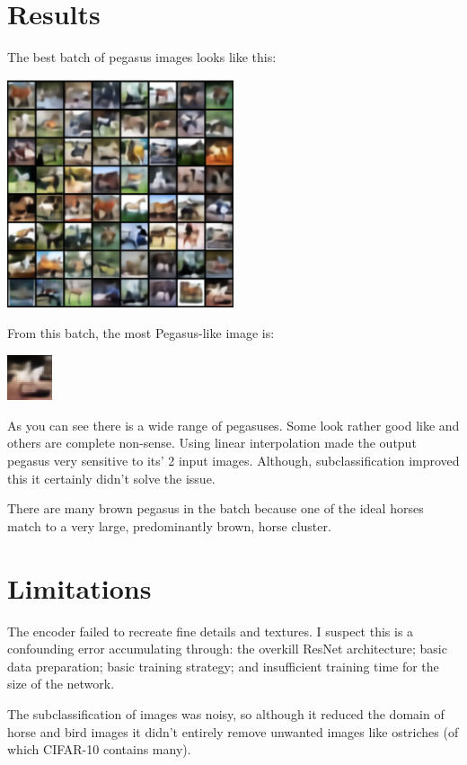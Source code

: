 \documentclass{article}
\begin{document}
\section{Results}
The best batch of pegasus images looks like this:
\begin{center}
    \includegraphics[width=0.5\textwidth]{figures/64_cropped.png}
\end{center}
From this batch, the most Pegasus-like image is:
\begin{center}
    \includegraphics[width=0.1\textwidth]{figures/1_cropped.png}
\end{center}

As you can see there is a wide range of pegasuses. Some look rather good like and others are complete non-sense. Using linear interpolation made the output pegasus very sensitive to its' 2 input images. Although, subclassification improved this it certainly didn't solve the issue.

There are many brown pegasus in the batch because one of the ideal horses match to a very large, predominantly brown, horse cluster.

\section{Limitations}
The encoder failed to recreate fine details and textures. I suspect this is a confounding error accumulating through: the overkill ResNet architecture; basic data preparation; basic training strategy; and insufficient training time for the size of the network.

The subclassification of images was noisy, so although it reduced the domain of horse and bird images it didn't entirely remove unwanted images like ostriches (of which CIFAR-10 contains many).
\end{document}
